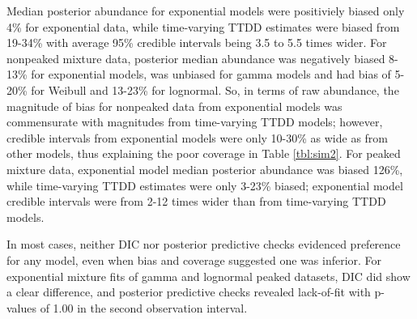\documentclass[useAMS,usenatbib,referee,12pt]{article}
\begin{document}
Median posterior abundance for exponential models were positiviely biased only 4\% for exponential data, while time-varying TTDD estimates were biased from 19-34\% with average 95\% credible intervals being 3.5 to 5.5 times wider.
For nonpeaked mixture data, posterior median abundance was negatively biased 8-13\% for exponential models, was unbiased for gamma models and had bias of 5-20\% for Weibull and 13-23\% for lognormal.
So, in terms of raw abundance, the magnitude of bias for nonpeaked data from exponential models was commensurate with magnitudes from time-varying TTDD models; however, credible intervals from exponential models were only 10-30\% as wide as from other models, thus explaining the poor coverage in Table \ref{tbl:sim2}.
For peaked mixture data, exponential model median posterior abundance was biased 126\%, while time-varying TTDD estimates were only 3-23\% biased; exponential model credible intervals were from 2-12 times wider than from time-varying TTDD models.

In most cases, neither DIC nor posterior predictive checks evidenced preference for any model, even when bias and coverage suggested one was inferior.  For  exponential mixture fits of gamma and lognormal peaked datasets, DIC did show a clear difference, and posterior predictive checks revealed lack-of-fit with p-values of 1.00 in the second observation interval.
\end{document}
